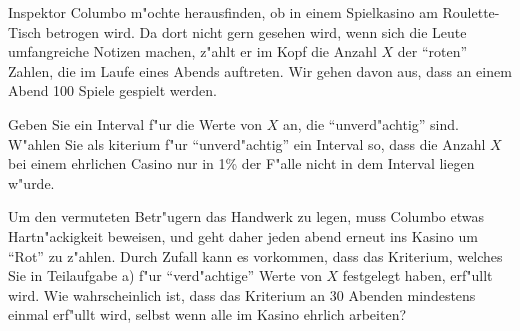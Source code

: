 Inspektor Columbo m"ochte herausfinden, ob in einem Spielkasino
am Roulette-Tisch betrogen wird.
Da dort nicht gern gesehen wird, wenn sich die Leute umfangreiche Notizen
machen, z"ahlt er im Kopf die Anzahl $X$ der ``roten'' Zahlen,
die im Laufe eines Abends auftreten.
Wir gehen davon aus, dass an einem Abend 100 Spiele gespielt werden.
\begin{teilaufgaben}
\item Geben Sie ein Interval f"ur die Werte von $X$ an, die ``unverd"achtig''
sind. W"ahlen Sie als kiterium f"ur ``unverd"achtig'' ein Interval so, dass
die Anzahl $X$ bei einem ehrlichen Casino nur in 1\% der F"alle nicht
in dem Interval liegen w"urde.
\item Um den vermuteten Betr"ugern das Handwerk zu legen, muss Columbo
etwas Hartn"ackigkeit beweisen, und geht daher jeden abend erneut
ins Kasino um ``Rot'' zu z"ahlen. Durch Zufall kann es vorkommen, dass
das Kriterium, welches Sie in Teilaufgabe a) f"ur ``verd"achtige''
Werte von $X$ festgelegt haben, erf"ullt wird. Wie wahrscheinlich ist,
dass das Kriterium an 30 Abenden mindestens einmal erf"ullt wird, selbst
wenn alle im Kasino ehrlich arbeiten?
\end{teilaufgaben}

